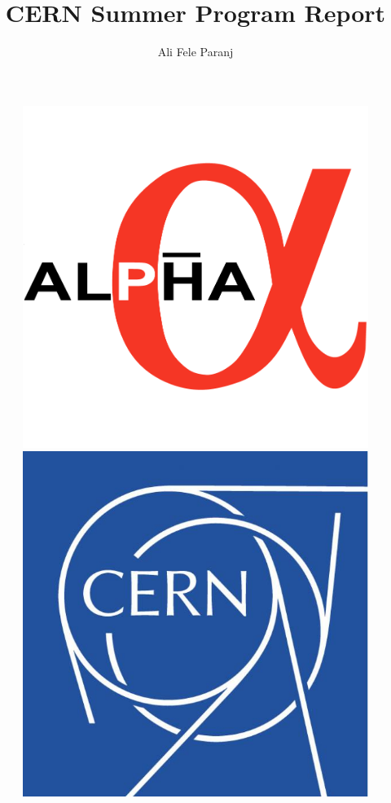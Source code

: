 \documentclass{article}
\title{CERN Summer Program Report}
\author{Ali Fele Paranj}
\begin{document}
\maketitle

\begin{figure}[h]

\includegraphics[scale=0.1]{Alpha}
\includegraphics[scale=0.1]{cern}

\end{figure}
\end{document}
